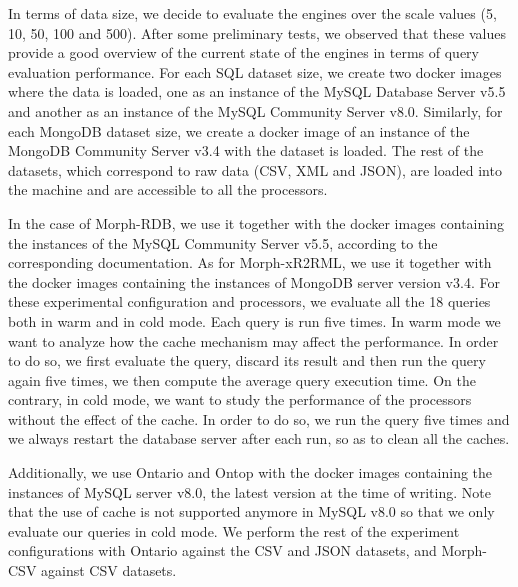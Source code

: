 In terms of data size, we decide to evaluate the engines over the scale values (5, 10, 50, 100 and 500). After some preliminary tests, we observed that these values provide a good overview of the current state of the engines in terms of query evaluation performance. For each SQL dataset size, we create two docker images where the data is loaded, one as an instance of the MySQL Database Server v5.5 and another as an instance of the MySQL Community Server v8.0. Similarly, for each MongoDB dataset size, we create a docker image of an instance of the MongoDB Community Server v3.4 with the dataset is loaded. The rest of the datasets, which correspond to raw data (CSV, XML and JSON), are loaded into the machine and are accessible to all the processors. 

In the case of Morph-RDB, we use it together with the docker images containing the instances of the MySQL Community Server v5.5, according to the corresponding documentation. As for Morph-xR2RML, we use it together with the docker images containing the instances of MongoDB server version v3.4. For these experimental configuration and processors, we evaluate all the 18 queries both in warm and in cold mode. Each query is run five times. In warm mode we want to analyze how the cache mechanism may affect the performance. In order to do so, we first evaluate the query, discard its result and then run  the query again five times, we then compute the average query execution time. On the contrary, in  cold mode, we want to study the performance of the processors without the effect of the cache. In order to do so, we run the query five times and we always restart the database server after each run, so as to clean all the caches. %

Additionally, we use Ontario and Ontop with the docker images containing the instances of MySQL server v8.0, the latest version at the time of writing. Note that the use of cache is not supported anymore in MySQL v8.0 so that we only evaluate our queries in cold mode. We perform the rest of the experiment configurations with Ontario against the CSV and JSON datasets, and Morph-CSV against CSV datasets. 

